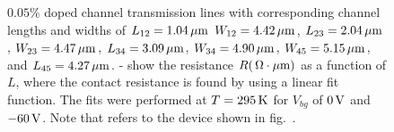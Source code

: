 \begin{figure}[ht]
	\caption[Contact resistance of $0.05\%$  doped  channel device]{\protect{} $0.05\%$  doped  channel transmission lines with corresponding channel lengths and widths of $L_{12} = 1.04\,\mathrm{\mu m}$ $W_{12} = 4.42\,\mathrm{\mu m}$, $L_{23} = 2.04\,\mathrm{\mu m}$, $W_{23} = 4.47\,\mathrm{\mu m}$, $L_{34} = 3.09\,\mathrm{\mu m}$, $W_{34} = 4.90\,\mathrm{\mu m}$, $W_{45} = 5.15\,\mathrm{\mu m}$, and $L_{45} = 4.27\,\mathrm{\mu m}$. \protect{}-\protect{} show the resistance $R (\,\mathrm{\Omega\cdot\mu m})$ as a function of $L$, where the contact resistance is found by using a linear fit function. The fits were performed at $T=295\,\mathrm{K}$ for $V_{bg}$ of $0\,\mathrm{V}$ and $-60\,\mathrm{V}$. Note that \protect{} refers to the device shown in fig.~\protect{}.}
	\label{fig:tlm_reistance_measurement}
\end{figure}
